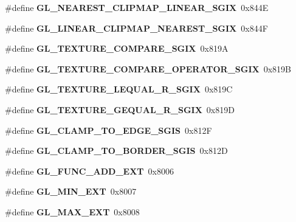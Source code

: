\begin{DoxyCompactItemize}
\item 
\#define {\bfseries G\+L\+\_\+\+N\+E\+A\+R\+E\+S\+T\+\_\+\+C\+L\+I\+P\+M\+A\+P\+\_\+\+L\+I\+N\+E\+A\+R\+\_\+\+S\+G\+I\+X}~0x844\+E\label{_s_d_l__opengl_8h_aa9bf16759a8aa8f8e86312a304af805f}

\item 
\#define {\bfseries G\+L\+\_\+\+L\+I\+N\+E\+A\+R\+\_\+\+C\+L\+I\+P\+M\+A\+P\+\_\+\+N\+E\+A\+R\+E\+S\+T\+\_\+\+S\+G\+I\+X}~0x844\+F\label{_s_d_l__opengl_8h_a0729f6506598058f32ee17ec60c73de3}

\item 
\#define {\bfseries G\+L\+\_\+\+T\+E\+X\+T\+U\+R\+E\+\_\+\+C\+O\+M\+P\+A\+R\+E\+\_\+\+S\+G\+I\+X}~0x819\+A\label{_s_d_l__opengl_8h_a2cfba54838052530ff8cec59b8b370a5}

\item 
\#define {\bfseries G\+L\+\_\+\+T\+E\+X\+T\+U\+R\+E\+\_\+\+C\+O\+M\+P\+A\+R\+E\+\_\+\+O\+P\+E\+R\+A\+T\+O\+R\+\_\+\+S\+G\+I\+X}~0x819\+B\label{_s_d_l__opengl_8h_a699706c40d227a888aa567c65e2c4ab1}

\item 
\#define {\bfseries G\+L\+\_\+\+T\+E\+X\+T\+U\+R\+E\+\_\+\+L\+E\+Q\+U\+A\+L\+\_\+\+R\+\_\+\+S\+G\+I\+X}~0x819\+C\label{_s_d_l__opengl_8h_a73597d96004701c3acd77b46b2e9c15d}

\item 
\#define {\bfseries G\+L\+\_\+\+T\+E\+X\+T\+U\+R\+E\+\_\+\+G\+E\+Q\+U\+A\+L\+\_\+\+R\+\_\+\+S\+G\+I\+X}~0x819\+D\label{_s_d_l__opengl_8h_a2c7515e9dcc5db444b45721131637ba1}

\item 
\#define {\bfseries G\+L\+\_\+\+C\+L\+A\+M\+P\+\_\+\+T\+O\+\_\+\+E\+D\+G\+E\+\_\+\+S\+G\+I\+S}~0x812\+F\label{_s_d_l__opengl_8h_a7ef043a00ac945f362d8084401a8c129}

\item 
\#define {\bfseries G\+L\+\_\+\+C\+L\+A\+M\+P\+\_\+\+T\+O\+\_\+\+B\+O\+R\+D\+E\+R\+\_\+\+S\+G\+I\+S}~0x812\+D\label{_s_d_l__opengl_8h_a1eb138a9f37352177296700349ab1334}

\item 
\#define {\bfseries G\+L\+\_\+\+F\+U\+N\+C\+\_\+\+A\+D\+D\+\_\+\+E\+X\+T}~0x8006\label{_s_d_l__opengl_8h_a8f043648e31e7f0b53ef160f159c9150}

\item 
\#define {\bfseries G\+L\+\_\+\+M\+I\+N\+\_\+\+E\+X\+T}~0x8007\label{_s_d_l__opengl_8h_a70f62d16502e28c2319711fd032320ea}

\item 
\#define {\bfseries G\+L\+\_\+\+M\+A\+X\+\_\+\+E\+X\+T}~0x8008\label{_s_d_l__opengl_8h_a21d769e684f6c26608a612ed04773515}


\end{DoxyCompactItemize}

